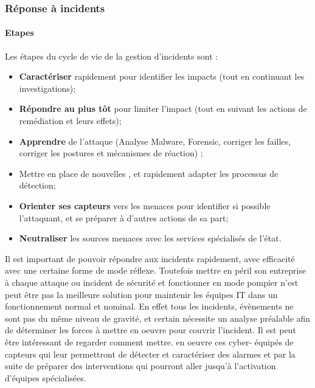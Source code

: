 \begin{frame}
\frametitle<presentation>{Réponse à incidents}
\framesubtitle<presentation>{Etapes}
Les étapes du cycle de vie de la gestion d'incidents sont :

\begin{itemize}
  \item \textbf{Caractériser} rapidement pour identifier les impacts (tout en continuant les investigations);
  \item \textbf{Répondre au plus tôt} pour limiter l'impact (tout en suivant les actions de remédiation et leurs effets);
  \item \textbf{Apprendre} de l'attaque (Analyse Malware, Forensic, corriger les failles, corriger les postures et mécanismes de réaction) ;
  \item Mettre en place de nouvelles , et rapidement adapter les processus de détection;
  \item \textbf{Orienter ses capteurs } vers les menaces pour identifier si possible l'attaquant, et se préparer à d'autres actions de sa part;
  \item \textbf{Neutraliser} les sources menaces avec les services spécialisés de l'état.
\end{itemize}
\end{frame}

Il est important de pouvoir répondre aux incidents rapidement, avec efficacité avec une certaine forme de mode réflexe. Toutefois mettre en péril son entreprise à chaque attaque ou incident de sécurité et fonctionner en mode pompier n'est peut être pas la meilleure  solution pour maintenir les équipes IT dans un fonctionnement normal et nominal. En effet tous les incidents, évènements ne sont pas du même niveau de gravité, et certain nécessite un analyse préalable afin de déterminer les forces à mettre en oeuvre pour couvrir l'incident. Il est peut être intéressant de regarder comment mettre. en oeuvre ces cyber- équipés de capteurs qui leur permettront de détecter et caractériser des alarmes et par la suite de préparer des interventions qui pourront aller jusqu'à l'activation d'équipes spécialisées.


